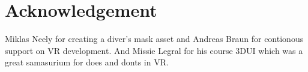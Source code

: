\documentclass[letterpaper, 10 pt, conference]{ieeeconf}  %
\begin{document}
\section*{Acknowledgement}
\label{Sec:Acknowledgement}

Miklas Neely for creating a diver's mask asset and Andreas Braun for contionous support on VR development.
And Missie Legral for his course 3DUI which was a great samasurium for does and donts in VR.









\printbibliography[
title={References},
notkeyword=game
]

\printbibliography[
title={Ludography},
keyword=game
]

\end{document}
